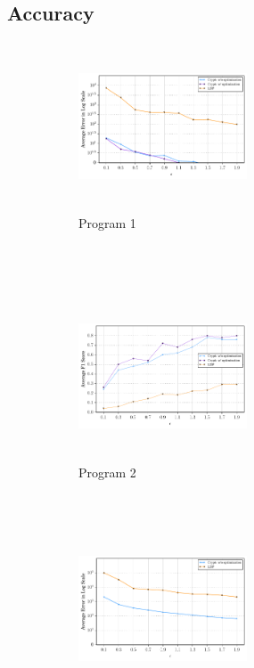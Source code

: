 \subsection{Accuracy}
\begin{figure}
    \centering
    \begin{subfigure}[b]{0.2\textwidth}
        \includegraphics[width=5cm,height=5cm]{test1_1.pdf}
        \caption{ Program 1}
        \label{fig:gull}
    \end{subfigure}\quad \qquad\quad \\%
    ~ %
    \begin{subfigure}[b]{0.3\textwidth}
       \qquad \includegraphics[width=5cm,height=5cm]{test2.pdf}
        \caption{ Program 2}
        \label{fig:tiger}
    \end{subfigure}
    ~ %
    \begin{subfigure}[b]{0.3\textwidth}
    \qquad    \includegraphics[width=5cm,height=5cm]{test3.pdf}

\end{subfigure}
\end{figure}
